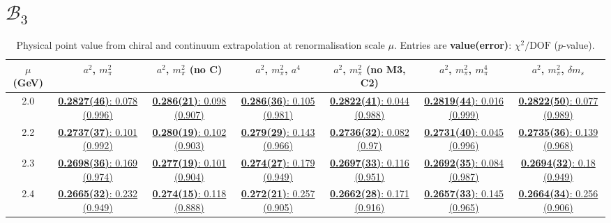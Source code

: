 \documentclass[12pt]{extarticle}
\begin{document}
\section{$\mathcal{B}_3$}
\begin{table}[h!]
\begin{center}
\begin{tabular}{|c|c|c|c|c|c|c|}
\hline
$\mu$ (GeV) & $a^2$, $m_\pi^2$& $a^2$, $m_\pi^2$ (no C)& $a^2$, $m_\pi^2$, $a^4$& $a^2$, $m_\pi^2$ (no M3, C2)& $a^2$, $m_\pi^2$, $m_\pi^4$& $a^2$, $m_\pi^2$, $\delta m_s$\\
\hline
2.0& \hyperlink{SSmPP/SUSY/bag_a2m2_20.pdf.1}{\textbf{0.2827(46)}: 0.078 (0.996)} & \hyperlink{SSmPP/SUSY/bag_a2m2noC_20.pdf.1}{\textbf{0.286(21)}: 0.098 (0.907)} & \hyperlink{SSmPP/SUSY/bag_a2a4m2_20.pdf.1}{\textbf{0.286(36)}: 0.105 (0.981)} & \hyperlink{SSmPP/SUSY/bag_a2m2mcut_20.pdf.1}{\textbf{0.2822(41)}: 0.044 (0.988)} & \hyperlink{SSmPP/SUSY/bag_a2m2m4_20.pdf.1}{\textbf{0.2819(44)}: 0.016 (0.999)} & \hyperlink{SSmPP/SUSY/bag_a2m2delm_20.pdf.1}{\textbf{0.2822(50)}: 0.077 (0.989)}\\
2.2& \hyperlink{SSmPP/SUSY/bag_a2m2_22.pdf.1}{\textbf{0.2737(37)}: 0.101 (0.992)} & \hyperlink{SSmPP/SUSY/bag_a2m2noC_22.pdf.1}{\textbf{0.280(19)}: 0.102 (0.903)} & \hyperlink{SSmPP/SUSY/bag_a2a4m2_22.pdf.1}{\textbf{0.279(29)}: 0.143 (0.966)} & \hyperlink{SSmPP/SUSY/bag_a2m2mcut_22.pdf.1}{\textbf{0.2736(32)}: 0.082 (0.97)} & \hyperlink{SSmPP/SUSY/bag_a2m2m4_22.pdf.1}{\textbf{0.2731(40)}: 0.045 (0.996)} & \hyperlink{SSmPP/SUSY/bag_a2m2delm_22.pdf.1}{\textbf{0.2735(36)}: 0.139 (0.968)}\\
2.3& \hyperlink{SSmPP/SUSY/bag_a2m2_23.pdf.1}{\textbf{0.2698(36)}: 0.169 (0.974)} & \hyperlink{SSmPP/SUSY/bag_a2m2noC_23.pdf.1}{\textbf{0.277(19)}: 0.101 (0.904)} & \hyperlink{SSmPP/SUSY/bag_a2a4m2_23.pdf.1}{\textbf{0.274(27)}: 0.179 (0.949)} & \hyperlink{SSmPP/SUSY/bag_a2m2mcut_23.pdf.1}{\textbf{0.2697(33)}: 0.116 (0.951)} & \hyperlink{SSmPP/SUSY/bag_a2m2m4_23.pdf.1}{\textbf{0.2692(35)}: 0.084 (0.987)} & \hyperlink{SSmPP/SUSY/bag_a2m2delm_23.pdf.1}{\textbf{0.2694(32)}: 0.18 (0.949)}\\
2.4& \hyperlink{SSmPP/SUSY/bag_a2m2_24.pdf.1}{\textbf{0.2665(32)}: 0.232 (0.949)} & \hyperlink{SSmPP/SUSY/bag_a2m2noC_24.pdf.1}{\textbf{0.274(15)}: 0.118 (0.888)} & \hyperlink{SSmPP/SUSY/bag_a2a4m2_24.pdf.1}{\textbf{0.272(21)}: 0.257 (0.905)} & \hyperlink{SSmPP/SUSY/bag_a2m2mcut_24.pdf.1}{\textbf{0.2662(28)}: 0.171 (0.916)} & \hyperlink{SSmPP/SUSY/bag_a2m2m4_24.pdf.1}{\textbf{0.2657(33)}: 0.145 (0.965)} & \hyperlink{SSmPP/SUSY/bag_a2m2delm_24.pdf.1}{\textbf{0.2664(34)}: 0.256 (0.906)}\\
\hline
\end{tabular}
\caption{Physical point value from chiral and continuum extrapolation at renormalisation scale $\mu$. Entries are \textbf{value(error)}: $\chi^2/\text{DOF}$ ($p$-value).}
\end{center}
\end{table}
\end{document}

